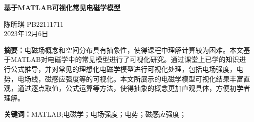 \documentclass[UTF8]{article}
\numberwithin{figure}{subsection}
\numberwithin{table}{subsection}
\begin{document}
\begin{center}
    \LARGE{\textbf{基于MATLAB可视化常见电磁学模型}}

    \vspace*{0.2cm}
    \normalsize{陈昕琪    PB22111711 \qquad \\ 2023年12月6日}
\end{center}
\normalsize
\noindent \textbf{摘要：}电磁场概念和空间分布具有抽象性，使得课程中理解计算较为困难。本文基于MATLAB对电磁学中的常见模型进行了可视化研究。通过课堂上已学的知识进行公式推导，并对常见的理想化电磁学模型进行可视化处理，包括电场强度，电势，电场线，磁感应强度等的可视化。本文所展示的电磁学模型可视化结果丰富直观，通过逐点取值，公式运算等方法，使得抽象的概念更加直观具体，方便初学者理解。

\noindent \textbf{关键词：}MATLAB;电磁学；电场强度；电势；磁感应强度；
\end{document}
